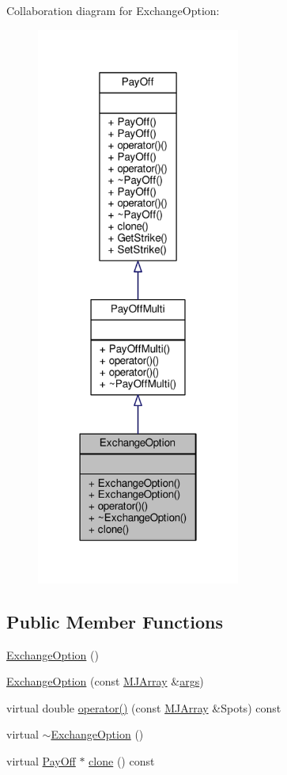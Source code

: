 Collaboration diagram for Exchange\+Option\+:
\nopagebreak
\begin{figure}[H]
\begin{center}
\leavevmode
\includegraphics[width=190pt]{classExchangeOption__coll__graph}
\end{center}
\end{figure}
\subsection*{Public Member Functions}
\begin{DoxyCompactItemize}
\item 
\hyperlink{classExchangeOption_a191e8afcc8384e43506d3c13e8dac6c5}{Exchange\+Option} ()
\item 
\hyperlink{classExchangeOption_a642fa4a55bab2deb15a4069824fcd581}{Exchange\+Option} (const \hyperlink{classMJArray}{M\+J\+Array} \&\hyperlink{path__generation_8h_a75c13cde2074f502cc4348c70528572d}{args})
\item 
virtual double \hyperlink{classExchangeOption_ae8d49f6d9d482c1e835e3f1c12a1a905}{operator()} (const \hyperlink{classMJArray}{M\+J\+Array} \&Spots) const
\item 
virtual \hyperlink{classExchangeOption_a4a68daa19012f51f02e3eba95373118c}{$\sim$\+Exchange\+Option} ()
\item 
virtual \hyperlink{classPayOff}{Pay\+Off} $\ast$ \hyperlink{classExchangeOption_ac780838b87eff5b33af728e5e38c1475}{clone} () const
\end{DoxyCompactItemize}
